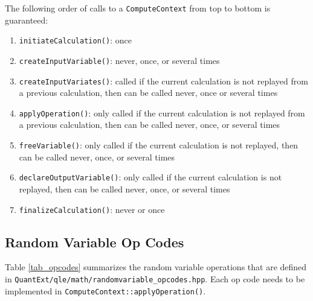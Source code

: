 \documentclass[12pt, a4paper]{article}
\begin{document}
The following order of calls to a \verb+ComputeContext+ from top to bottom is guaranteed:

\begin{enumerate}
\item \verb+initiateCalculation()+: once
\item \verb+createInputVariable()+: never, once, or several times
\item \verb+createInputVariates()+: called if the current calculation is not replayed from a previous calculation, then can be called never, once or several times
\item \verb+applyOperation()+: only called if the current calculation is not replayed from a previous calculation, then can be called never, once, or several times
\item \verb+freeVariable()+: only called if the current calculation is not replayed, then can be called never, once, or several times
\item \verb+declareOutputVariable()+: only called if the current calculation is not replayed, then can be called never, once, or several times
\item \verb+finalizeCalculation()+: never or once
\end{enumerate}

\subsection{Random Variable Op Codes}\label{randomVariableOpCodes}

Table \ref{tab_opcodes} summarizes the random variable operations that are defined in
\verb+QuantExt/qle/math/randomvariable_opcodes.hpp+. Each op code needs to be implemented in
\verb+ComputeContext::applyOperation()+.
\end{document}
